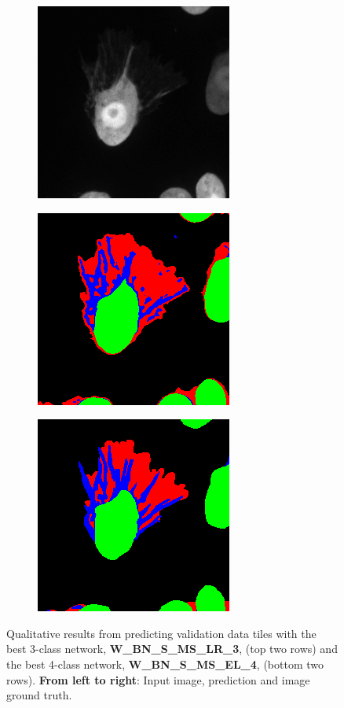 \begin {figure}[!htb]
\begin {subfigure}[b]{0.25\linewidth}
	\end {subfigure}
	\par\medskip
	\begin {subfigure}[b]{0.25\linewidth}
		\includegraphics[scale=0.45]{img/fig_quali_tile4.png}
	\end {subfigure}\hspace{0.5cm}
	\begin {subfigure}[b]{0.25\linewidth}
		\includegraphics[scale=0.45]{img/fig_quali_tile4_pred_c4.png}
	\end {subfigure}\hspace{0.5cm}
	\begin {subfigure}[b]{0.25\linewidth}
		\includegraphics[scale=0.45]{img/fig_quali_tile4_pred_c4_GT.png}
	\end {subfigure}

		\caption[Qualitative prediction results.]{Qualitative results from predicting validation data tiles with the best 3-class network, \textbf{W\_BN\_S\_MS\_LR\_3}, (top two rows) and the best 4-class network, \textbf{W\_BN\_S\_MS\_EL\_4}, (bottom two rows). \textbf{From left to right}: Input image, prediction and image ground truth.}
		\label{fig:qualitative}
\end {figure}